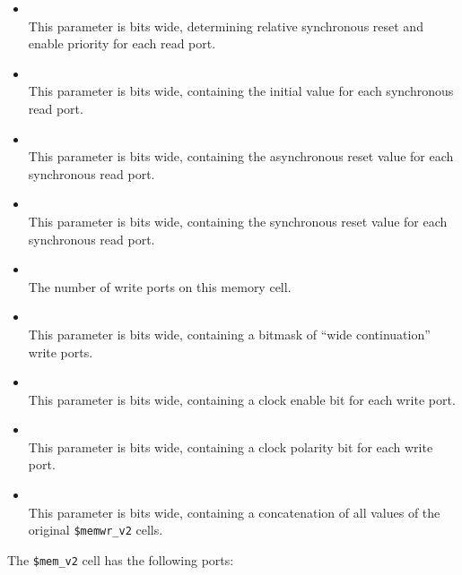 \begin{itemize}
\item {} \\
This parameter is  bits wide, determining relative synchronous reset and enable priority for each read port.

\item {} \\
This parameter is  bits wide, containing the initial value for each synchronous read port.

\item {} \\
This parameter is  bits wide, containing the asynchronous reset value for each synchronous read port.

\item {} \\
This parameter is  bits wide, containing the synchronous reset value for each synchronous read port.

\item {} \\
The number of write ports on this memory cell.

\item {} \\
This parameter is  bits wide, containing a bitmask of ``wide continuation'' write ports.

\item {} \\
This parameter is  bits wide, containing a clock enable bit for each write port.

\item {} \\
This parameter is  bits wide, containing a clock polarity bit for each write port.

\item {} \\
This parameter is  bits wide, containing a concatenation of all
 values of the original {\tt \$memwr\_v2} cells.
\end{itemize}

The {\tt \$mem\_v2} cell has the following ports:

